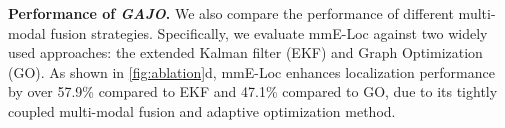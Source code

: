 \textbf{Performance of \textit{GAJO}.}
We also compare the performance of different multi-modal fusion strategies. 
Specifically, we evaluate mmE-Loc against two widely used approaches: the extended Kalman filter (EKF) and Graph Optimization (GO). 
As shown in \fig \ref{fig:ablation}d, mmE-Loc enhances localization performance by over 57.9\% compared to EKF and 47.1\% compared to GO, due to its tightly coupled multi-modal fusion and adaptive optimization method.



\vspace{-0.3cm}
